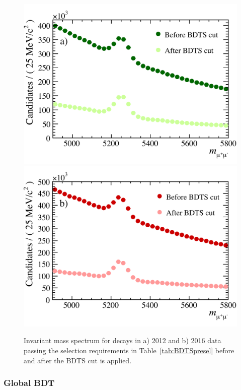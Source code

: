 \begin{figure}[tbp]
    \centering
        \includegraphics[width= 0.49 \textwidth]{./Figs/Selection/BDTS_impact_2012.pdf}
        \includegraphics[width= 0.49 \textwidth]{./Figs/Selection/BDTS_impact_2016.pdf}

    \caption{Invariant mass spectrum for \bhh decays in a) 2012 and b) 2016 data passing the selection requirements in Table~\ref{tab:BDTSpresel} before and after the BDTS cut is applied.}
    \label{fig:BDTSpreformance}
\end{figure}



\subsubsection{Global BDT}
\label{sec:globalBDT}

